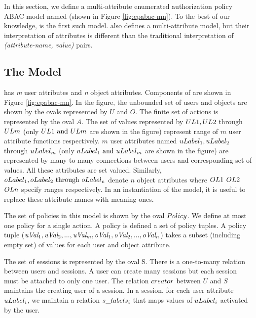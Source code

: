 	In this section, we define a multi-attribute enumerated authorization policy ABAC model named \EPMNModel{} (shown in Figure \ref{fig:epabac-mn}). To the best of our knowledge, \EPMNModel{} is the first such model. \PM{}\cite{policy-machine} also defines a multi-attribute \EPModels{} model, but their interpretation of attributes is different than the traditional interpretation of \textit{(attribute-name, value)} pairs.
	
	\subsection{The \EPMNModel{} Model }
	\label{sec:epmodels}
	\label{sec:epmodel}	
	
	
	
	
	\EPMNModel{} has \textit{m} user attributes and \textit{n} object attributes. Components of \EPMNModel{}  are shown in Figure \ref{fig:epabac-mn}.  In the figure, the unbounded set of users and objects are shown by the ovals represented by $U$ and $O$. The finite set of actions is represented by the oval $A$. The set of values represented by $UL{1}, UL{2}$ through $UL{m}$ (only $UL{1} \text{ and } UL{m}$ are shown in the figure) represent range of $m$ user attribute functions respectively.  $m$ user attributes named $uLabel_{1}, uLabel_{2}$ through $uLabel_{m}$ (only $uLabel_{1} \text{ and } uLabel_{m}$ are shown in the figure) are represented by many-to-many connections between users and  corresponding set of values. All these attributes are set valued. Similarly, $oLabel_{1}, oLabel_{2} \text{ through } oLabel_{n}$ denote $n$ object attributes where $OL{1}$ $OL{2}$  $OL{n}$ specify ranges respectively. In an instantiation of the model, it is useful to replace these  attribute names with meaning ones.
	

	
	
	The set of policies in this model is shown by the oval $Policy$. We define at most one policy for a single action. A policy is defined a set of policy tuples. A policy tuple  ($\textit{uVal}_{1},\textit{uVal}_{2}, ..., \textit{uVal}_{m}, \textit{oVal}_{1},\textit{oVal}_{2}, ..., \textit{oVal}_{n}$) takes a subset (including empty set) of values for each user and object attribute.
	
	
	
	
	The set of sessions is represented by the oval S. There is a one-to-many relation between users and sessions. A user can create many sessions but each session must be attached to only one user. The relation $creator$ between $U$ and $S$ maintains the creating user of a session. In a session, for each user attribute $uLabel_{i}$, we maintain a relation $s\_labels_{i}$ that maps values of $uLabel_{i}$ activated by the user. 
	
